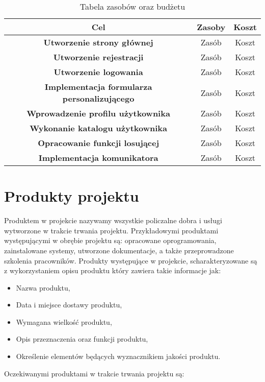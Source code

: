 \documentclass[12pt,a4paper]{article}
\begin{document}
\begin{table}[htb]
\centering
  \begin{tabular}{c|c|c}
  \hline
  {\bf Cel} & {\bf Zasoby} & {\bf Koszt} \\
  \hline
  \textbf{Utworzenie strony głównej} & Zasób & Koszt\\
  \hline
  \textbf{Utworzenie rejestracji} & Zasób & Koszt\\
  \hline
  \textbf{Utworzenie logowania} & Zasób & Koszt\\
  \hline
  \textbf{Implementacja formularza personalizującego} & Zasób & Koszt\\
  \hline
  \textbf{Wprowadzenie profilu użytkownika} & Zasób & Koszt\\
  \hline
  \textbf{Wykonanie katalogu użytkownika} & Zasób & Koszt\\
  \hline
  \textbf{Opracowanie funkcji losującej} & Zasób & Koszt\\
  \hline
  \textbf{Implementacja komunikatora} & Zasób & Koszt\\
  \hline
  \end{tabular}
\caption{Tabela zasobów oraz budżetu}
\label{tab:zasoby}
\end{table}

\newpage

\section{Produkty projektu}

Produktem w projekcie nazywamy wszystkie policzalne dobra i usługi wytworzone w trakcie trwania projektu. Przykładowymi produktami występującymi w obrębie projektu są: opracowane oprogramowania, zainstalowane systemy, utworzone dokumentacje, a także przeprowadzone szkolenia pracowników. Produkty występujące w projekcie, scharakteryzowane są z wykorzystaniem opisu produktu który zawiera takie informacje jak: 
\begin{itemize}
    \item Nazwa produktu,
    \item Data i miejsce dostawy produktu, 
    \item Wymagana wielkość produktu, 
    \item Opis przeznaczenia oraz funkcji produktu, 
    \item Określenie elementów będących wyznacznikiem jakości produktu.
\end{itemize}

\newpage
Oczekiwanymi produktami w trakcie trwania projektu są: 
\end{document}
